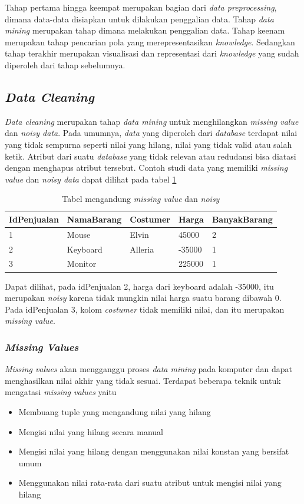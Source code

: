 Tahap pertama hingga keempat merupakan bagian dari \textsl{data preprocessing}, dimana data-data disiapkan untuk dilakukan penggalian data. Tahap \textsl{data mining} merupakan tahap dimana melakukan penggalian data. Tahap keenam merupakan tahap pencarian pola yang merepresentasikan \textsl{knowledge}. Sedangkan tahap terakhir merupakan visualisasi dan representasi dari \textsl{knowledge} yang sudah diperoleh dari tahap sebelumnya.


\subsection{\textsl{Data Cleaning}}
\textsl{Data cleaning} merupakan tahap \textsl{data mining} untuk menghilangkan \textsl{missing value} dan \textsl{noisy data}. Pada umumnya, \textsl{data} yang diperoleh dari \textsl{database} terdapat nilai yang tidak sempurna seperti nilai yang hilang, nilai yang tidak valid atau salah ketik. Atribut dari suatu \textsl{database} yang tidak relevan atau redudansi bisa diatasi dengan menghapus atribut tersebut. Contoh studi data yang memiliki \textsl{missing value} dan \textsl{noisy data} dapat dilihat pada tabel \ref{table:contohMissingNNoisy}

\begin{table}[h]
\caption{Tabel mengandung \textsl{missing value} dan \textsl{noisy}}
\label{table:contohMissingNNoisy}
\begin{tabular}{|l|l|l|l|l|}
\hline
IdPenjualan & NamaBarang & Costumer & Harga  & BanyakBarang \\ \hline
1           & Mouse      & Elvin    & 45000  & 2            \\ \hline
2           & Keyboard   & Alleria  & -35000 & 1            \\ \hline
3           & Monitor    &          & 225000 & 1            \\ \hline
\end{tabular}
\end{table}

Dapat dilihat, pada idPenjualan 2, harga dari keyboard adalah -35000, itu merupakan \textsl{noisy} karena tidak mungkin nilai harga suatu barang dibawah 0. Pada idPenjualan 3, kolom \textsl{costumer} tidak memiliki nilai, dan itu merupakan \textsl{missing value}.

\subsubsection{\textsl{Missing Values}}
\textsl{Missing values} akan mengganggu proses \textsl{data mining} pada komputer dan dapat menghasilkan nilai akhir yang tidak sesuai. Terdapat beberapa teknik untuk mengatasi \textsl{missing values} yaitu
	\begin{itemize}
		\item Membuang tuple yang mengandung nilai yang hilang\textit{\textit{}}
		\item Mengisi nilai yang hilang secara manual
		\item Mengisi nilai yang hilang dengan menggunakan nilai konstan yang bersifat umum
		\item Menggunakan nilai rata-rata dari suatu atribut untuk mengisi nilai yang hilang
	\end{itemize}
